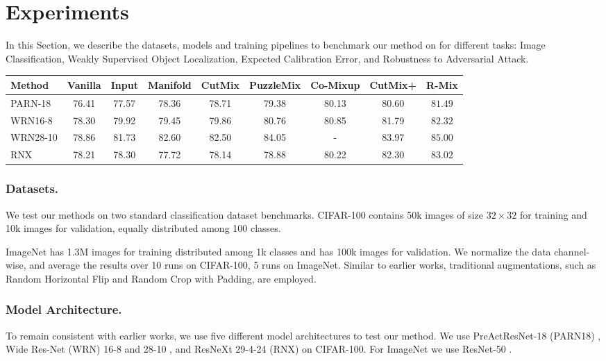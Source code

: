 \documentclass[letterpaper]{article} \usepackage[submission]{aaai23}  \usepackage{times}  \usepackage{helvet}  \usepackage{courier}  \usepackage[hyphens]{url}  \usepackage{graphicx} \urlstyle{rm} \def\UrlFont{\rm}  \usepackage{natbib}  \usepackage{caption} \frenchspacing  \setlength{\pdfpagewidth}{8.5in} \setlength{\pdfpageheight}{11in}
\newcommand{\cifar}{CIFAR-100}
\newcommand{\imagenet}{ImageNet}
\begin{document}
\section{Experiments}
\label{sec:exp}
In this Section, we describe the datasets, models and training pipelines to benchmark our method on for different tasks: Image Classification, Weakly Supervised Object Localization, Expected Calibration Error, and Robustness to Adversarial Attack.

\begin{table*}[t]
  \centering
  \begin{tabular}{lcccc|cc|cc}
\hline
Method & Vanilla & Input & Manifold & CutMix & PuzzleMix & Co-Mixup & \textbf{CutMix+} & \textbf{R-Mix} \\ \hline
PARN-18 & 76.41 & 77.57 & 78.36 & 78.71 & 79.38 & 80.13 & 80.60 & $\mathbf{81.49}$ \\ 
WRN16-8 & 78.30 & 79.92 & 79.45 & 79.86 & 80.76 & 80.85 & 81.79 & $\mathbf{82.32}$ \\ 
WRN28-10 & 78.86 & 81.73 & 82.60 & 82.50 & 84.05 & - & 83.97 & $\mathbf{85.00}$ \\ 
RNX & 78.21 & 78.30 & 77.72 & 78.14 & 78.88 & 80.22 & 82.30 & $\mathbf{83.02}$ \\ \hline
\end{tabular}
\caption{Top-1 Accuracy (\%) on \cifar{} with various models and methods trained for 300 epochs. Higher is better. Bold indicates the best result.}
  \label{tab:results}
\end{table*}

\subsubsection{Datasets.} We test our methods on two standard classification dataset benchmarks. \cifar{} \cite{Krizhevsky09cifar100} contains 50k images of size $32 \times 32$ for training and 10k images for validation, equally distributed among 100 classes.

\imagenet{} \cite{Russakovski2015ImageNet} has 1.3M images for training distributed among 1k classes and has 100k images for validation. We normalize the data channel-wise, and average the results over 10 runs on \cifar{}, 5 runs on \imagenet{}. Similar to earlier works, traditional augmentations, such as Random Horizontal Flip and Random Crop with Padding, are employed. 

\subsubsection{Model Architecture.} To remain consistent with earlier works, we use five different model architectures to test our method. We use PreActResNet-18 (PARN18) \cite{he2016preact}, Wide Res-Net (WRN) 16-8 and 28-10 \cite{zagoruyko2017widern}, and ResNeXt 29-4-24 (RNX) \cite{xie2016resnext} on \cifar{}. For \imagenet{} we use ResNet-50 \cite{he2016resnet}.
\end{document}
